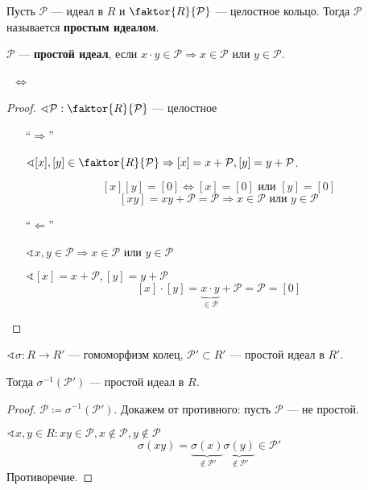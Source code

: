 \begin{definition}[1]
    \label{простой идеал 1}
    Пусть \(\mathcal{P}\) --- идеал в \(R\) и \(\faktor{R}{\mathcal{P}}\) --- целостное кольцо. Тогда \(\mathcal{P}\) называется \textbf{простым идеалом}.
\end{definition}

\begin{definition}[2]
    \label{простой идеал 2}
    \(\mathcal{P}\) --- \textbf{простой идеал}, если \(x \cdot y \in \mathcal{P} \Rightarrow x \in \mathcal{P}\) или \(y \in \mathcal{P}\).
\end{definition}

\begin{lemma}
    ~\(\Leftrightarrow\)~
\end{lemma}
\begin{proof}\itemfix
    \(\sphericalangle \mathcal{P} : \faktor{R}{\mathcal{P}}\) --- целостное
    \begin{itemize}
        \item [``\(\Rightarrow\)'']

              \(\sphericalangle [x], [y] \in \faktor{R}{\mathcal{P}} \Rightarrow [x] = x + \mathcal{P}, [y] = y + \mathcal{P}\).

              \[[x][y] = [0] \Leftrightarrow [x] = [0] \text{ или } [y] = [0]\]
              \[[xy] = xy + \mathcal{P} = \mathcal{P} \Rightarrow x \in \mathcal{P} \text{ или } y \in \mathcal{P}\]
        \item [``\(\Leftarrow\)'']

              \(\sphericalangle x, y \in \mathcal{P} \Rightarrow x \in \mathcal{P}\) или \(y \in \mathcal{P}\)

              \(\sphericalangle [x] = x + \mathcal{P}, [y] = y + \mathcal{P}\)
              \[[x] \cdot [y] = \underbrace{x \cdot y}_{\in \mathcal{P}} + \mathcal{P} = \mathcal{P} = [0]\]
    \end{itemize}
\end{proof}

\begin{lemma}
    \(\sphericalangle \sigma : R \to R'\) --- гомоморфизм колец, \(\mathcal{P}' \subset R'\) --- простой идеал в \(R'\).

    Тогда \(\sigma^{-1}(\mathcal{P}')\) --- простой идеал в \(R\).
\end{lemma}
\begin{proof}
    \(\mathcal{P} \coloneqq \sigma^{-1}(\mathcal{P}')\). Докажем от противного: пусть \(\mathcal{P}\) --- не простой.

    \(\sphericalangle x, y \in R : xy \in \mathcal{P}, x \notin \mathcal{P}, y \notin \mathcal{P}\)
    \[\sigma(xy) = \underbrace{\sigma(x)}_{\notin \mathcal{P}'}\underbrace{\sigma(y)}_{\notin \mathcal{P}'} \in \mathcal{P}'\]
    Противоречие.
\end{proof}

